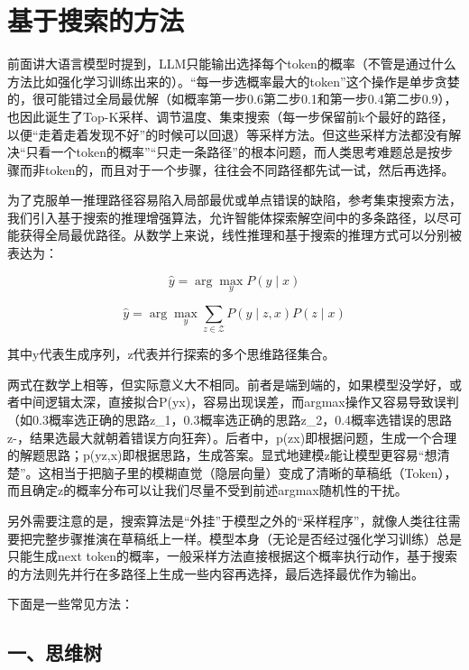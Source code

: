\clearpage

\hypertarget{ux57faux4e8eux641cux7d22ux7684ux65b9ux6cd5}{%
\section{基于搜索的方法}\label{ux57faux4e8eux641cux7d22ux7684ux65b9ux6cd5}}

前面讲大语言模型时提到，LLM只能输出选择每个token的概率（不管是通过什么方法比如强化学习训练出来的）。``每一步选概率最大的token''这个操作是单步贪婪的，很可能错过全局最优解（如概率第一步0.6第二步0.1和第一步0.4第二步0.9），也因此诞生了Top-K采样、调节温度、集束搜索（每一步保留前k个最好的路径，以便``走着走着发现不好''的时候可以回退）等采样方法。但这些采样方法都没有解决``只看一个token的概率''``只走一条路径''的根本问题，而人类思考难题总是按步骤而非token的，而且对于一个步骤，往往会不同路径都先试一试，然后再选择。

为了克服单一推理路径容易陷入局部最优或单点错误的缺陷，参考集束搜索方法，我们引入基于搜索的推理增强算法，允许智能体探索解空间中的多条路径，以尽可能获得全局最优路径。从数学上来说，线性推理和基于搜索的推理方式可以分别被表达为：

\[
\hat{y}=\arg\max_y P(y\mid x)
\]

\[
\hat{y}=\arg\max_y\sum_{z\in\mathcal{Z}}P(y\mid z,x)P(z\mid x)
\]

其中y代表生成序列，z代表并行探索的多个思维路径集合。

两式在数学上相等，但实际意义大不相同。前者是端到端的，如果模型没学好，或者中间逻辑太深，直接拟合P(y\textbar x)，容易出现误差，而argmax操作又容易导致误判（如0.3概率选正确的思路z\_1，0.3概率选正确的思路z\_2，0.4概率选错误的思路z-，结果选最大就朝着错误方向狂奔）。后者中，p(z\textbar x)即根据问题，生成一个合理的解题思路；p(y\textbar z,x)即根据思路，生成答案。显式地建模z能让模型更容易``想清楚''。这相当于把脑子里的模糊直觉（隐层向量）变成了清晰的草稿纸（Token），而且确定z的概率分布可以让我们尽量不受到前述argmax随机性的干扰。

另外需要注意的是，搜索算法是``外挂''于模型之外的``采样程序''，就像人类往往需要把完整步骤推演在草稿纸上一样。模型本身（无论是否经过强化学习训练）总是只能生成next token的概率，一般采样方法直接根据这个概率执行动作，基于搜索的方法则先并行在多路径上生成一些内容再选择，最后选择最优作为输出。

下面是一些常见方法：

\hypertarget{ux4e00ux601dux7ef4ux6811}{%
\subsection{一、思维树}\label{ux4e00ux601dux7ef4ux6811}}

